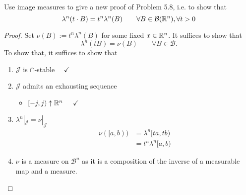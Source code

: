 \begin{thm}[Problem 7.7]
Use image measures to give a new proof of Problem 5.8, i.e. to show that
\[
\lambda ^n(t\cdot B)=t^n\lambda ^n(B) \qquad \forall B\in \mathcal{B}(\Bbb{R}^n),\forall t>0
\]
\end{thm}

\begin{proof}
Set \(\nu (B):=t^n\lambda ^n(B)\) for some fixed \(x\in \Bbb{R}^n\). It suffices to show that
\[
\lambda ^n(tB)=\nu (B)\qquad \forall B\in \mathcal{B}.
\]
To show that, it suffices to show that

\begin{enumerate}
  \item \(\mathcal{J}\) is \(\cap \)-stable $\quad \checkmark$
  \item \(\mathcal{J}\) admits an exhausting sequence
\begin{itemize}
  \item \([-j,j)\uparrow \Bbb{R}^n\) \(\quad \checkmark\)
\end{itemize}
  \item \(\lambda ^n|_\mathcal{J}=\nu |_\mathcal{J}\)
\begin{align*}
\nu ([a,b))&=\lambda ^n[ta,tb) \\
&=t^n\lambda ^n[a,b)
\end{align*}
  \item \(\nu \) is a measure on \(\mathcal{B}^n\) as it is a composition of the inverse of a  measurable map and a measure.
\end{enumerate}
\end{proof}




